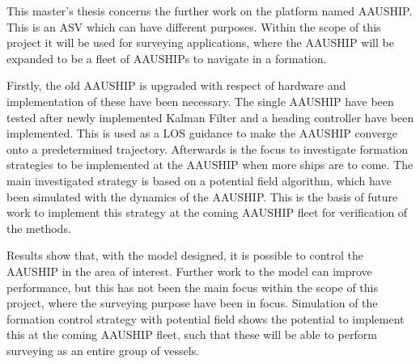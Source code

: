 This master's thesis concerns the further work on the platform named
AAUSHIP. This is an \acf{ASV} which can have different
purposes.  Within the scope of this project it will be used for
surveying applications, where the AAUSHIP will be expanded to be a
fleet of AAUSHIPs to navigate in a formation.

Firstly, the old
AAUSHIP is upgraded with respect of hardware and implementation of these
have been necessary. The single AAUSHIP have been tested after newly
implemented Kalman Filter and a heading controller have been
implemented. This is used as a \acf{LOS} guidance to make the AAUSHIP
converge onto a predetermined trajectory. Afterwards is the focus to
investigate formation strategies to be implemented at the AAUSHIP when
more ships are to come. The main investigated strategy is based on a
potential field algorithm, which have been simulated with the dynamics
of the AAUSHIP. This is the basis of future work to implement this
strategy at the coming AAUSHIP fleet for verification of the methods.

Results show that, with the model designed, it is possible to control
the AAUSHIP in the area of interest. Further work to the model can
improve performance, but this has not been the main focus within the
scope of this project, where the surveying purpose have been in
focus. Simulation of the formation control strategy with potential
field shows the potential to implement this at the coming AAUSHIP
fleet, such that these will be able to perform surveying as an entire
group of vessels.
